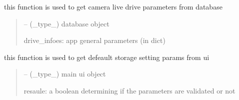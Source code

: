 \documentclass[letterpaper,10pt,english]{sphinxmanual}
\begin{document}

\begin{savenotes}\begin{fulllineitems}
\label{\detokenize{setting/backend/storage_funcs:oxin.backend.storage_funcs.get_camera_live_drive_parameters_from_db}}
\pysigstartsignatures
{}
\pysigstopsignatures
\sphinxAtStartPar
this function is used to get camera live drive parameters from database
\begin{quote}\begin{description}
\sphinxAtStartPar
{} – (\_type\_) database object

\sphinxAtStartPar
drive\_infoes: app general parameters (in dict)

\end{description}\end{quote}

\end{fulllineitems}\end{savenotes}


\begin{savenotes}\begin{fulllineitems}
\label{\detokenize{setting/backend/storage_funcs:oxin.backend.storage_funcs.get_camera_live_drive_parameters_from_ui}}
\pysigstartsignatures
{}
\pysigstopsignatures
\sphinxAtStartPar
this function is used to get defeault storage setting params from ui
\begin{quote}\begin{description}
\sphinxAtStartPar
{} – (\_type\_) main ui object

\sphinxAtStartPar
resaule: a boolean determining if the parameters are validated or not

\end{description}\end{quote}

\end{fulllineitems}\end{savenotes}
\end{document}
